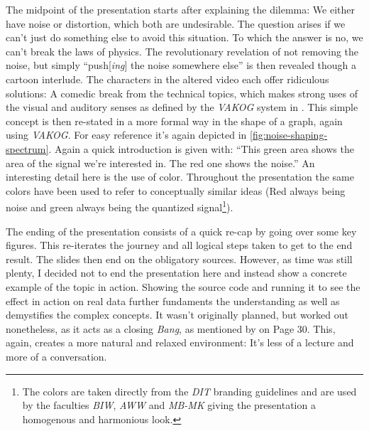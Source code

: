 The midpoint of the presentation starts after explaining the dilemma: We either have noise or distortion, which both are undesirable.
The question arises if we can't just do something else to avoid this situation.
To which the answer is no, we can't break the laws of physics.
The revolutionary revelation of not removing the noise, but simply \enquote{push{[\textit{ing}]} the noise somewhere else} is then revealed though a cartoon interlude.
The characters in the altered video each offer ridiculous solutions: A comedic break from the technical topics, which makes strong uses of the visual and auditory senses as defined by the \textit{VAKOG} system in \autocite[Page 77]{williams2008presentations}.
This simple concept is then re-stated in a more formal way in the shape of a graph, again using \textit{VAKOG}.
For easy reference it's again depicted in \autoref{fig:noise-shaping-spectrum}.
Again a quick introduction is given with:
\enquote{This green area shows the area of the signal we're interested in. The red one shows the noise.}
An interesting detail here is the use of color.
Throughout the presentation the same colors have been used to refer to conceptually similar ideas
(Red always being noise and green always being the quantized signal\footnote{The colors are taken directly from the \textit{DIT} branding guidelines and are used by the faculties \textcolor{THDGreen}{\textit{BIW}}, \textcolor{THDDarkRed}{\textit{AWW}} and \textcolor{THDStrongBlue}{\textit{MB-MK}} giving the presentation a homogenous and harmonious look.}).

The ending of the presentation consists of a quick re-cap by going over some key figures.
This re-iterates the journey and all logical steps taken to get to the end result.
The slides then end on the obligatory sources.
However, as time was still plenty, I decided not to end the presentation here and instead show a concrete example of the topic in action.
Showing the source code and running it to see the effect in action on real data further fundaments the understanding as well as demystifies the complex concepts.
It wasn't originally planned, but worked out nonetheless, as it acts as a closing \textit{Bang}, as mentioned by \citeauthor{williams2008presentations} on Page 30.
This, again, creates a more natural and relaxed environment:
It's less of a lecture and more of a conversation.
